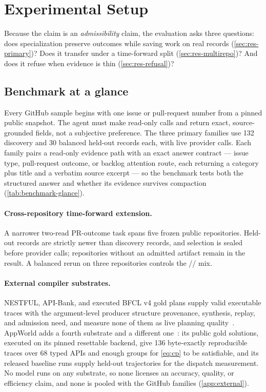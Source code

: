 \section{Experimental Setup}
\label{sec:setup}

Because the claim is an \emph{admissibility} claim, the evaluation asks three
questions: does specialization preserve outcomes while saving work on real
records (\cref{sec:res-primary})? Does it transfer under a time-forward split
(\cref{sec:res-multirepo})? And does it refuse when evidence is thin
(\cref{sec:res-refusal})?

\subsection{Benchmark at a glance}
\label{sec:benchmark}

Every GitHub sample begins with one issue or pull-request number from a pinned
public snapshot. The agent must make read-only calls and return exact,
source-grounded fields, not a subjective preference. The three primary families
use 132 discovery and 30 balanced held-out records each, with live provider
calls. Each family pairs a read-only evidence path with an exact answer contract
--- issue type, pull-request outcome, or backlog attention route, each returning a
category plus title and a verbatim source excerpt --- so the benchmark tests both
the structured answer and whether its evidence survives compaction
(\cref{tab:benchmark-glance}).

\paragraph{Cross-repository time-forward extension.}
A narrower two-read PR-outcome task spans five frozen public repositories.
Held-out records are strictly newer than discovery records, and selection is
sealed before provider calls; repositories without an admitted artifact remain
in the result. A balanced rerun on three repositories controls the
// mix.

\paragraph{External compiler substrates.}
NESTFUL, API-Bank, and executed BFCL v4 gold plans supply valid executable traces
with the argument-level producer structure provenance, synthesis, replay, and
admission need, and measure none of them as live planning
quality~\citep{basu2025nestful,li2023apibank,patil2025bfcl}. AppWorld adds a
fourth substrate and a different one~\citep{trivedi2024appworld}: its public gold
solutions, executed on its pinned resettable backend, give 136 byte-exactly
reproducible traces over 68 typed APIs and enough groups for \cref{eq:cp} to be
satisfiable, and its released baseline runs supply held-out trajectories for the
dispatch measurement. No model runs on any substrate, so none licenses an
accuracy, quality, or efficiency claim, and none is pooled with the GitHub
families (\cref{app:external}).

